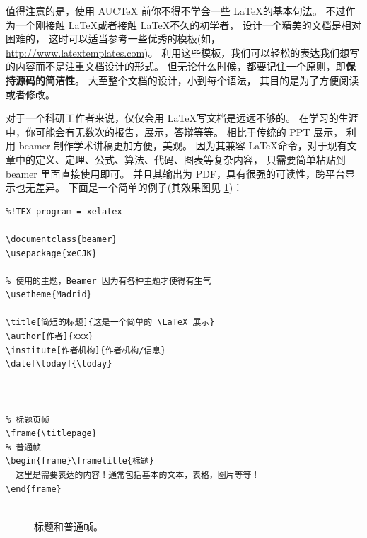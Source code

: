 值得注意的是，使用 AUCTeX 前你不得不学会一些 \LaTeX 的基本句法。
不过作为一个刚接触 \LaTeX 或者接触 \LaTeX 不久的初学者，
设计一个精美的文档是相对困难的，
这时可以适当参考一些优秀的模板(如，\url{http://www.latextemplates.com})。
利用这些模板，我们可以轻松的表达我们想写的内容而不是注重文档设计的形式。
但无论什么时候，都要记住一个原则，即\textbf{保持源码的简洁性}。
大至整个文档的设计，小到每个语法，
其目的是为了方便阅读或者修改。

对于一个科研工作者来说，仅仅会用 \LaTeX 写文档是远远不够的。
在学习的生涯中，你可能会有无数次的报告，展示，答辩等等。
相比于传统的 PPT 展示，
利用 beamer 制作学术讲稿更加方便，美观。
因为其兼容 \LaTeX 命令，对于现有文章中的定义、定理、公式、算法、代码、图表等复杂内容，
只需要简单粘贴到 beamer 里面直接使用即可。
并且其输出为 PDF，具有很强的可读性，跨平台显示也无差异。
下面是一个简单的例子(其效果图见 \ref{fig:beamer})：
\begin{verbatim}
%!TEX program = xelatex

\documentclass{beamer}
\usepackage{xeCJK}

% 使用的主题，Beamer 因为有各种主题才使得有生气
\usetheme{Madrid}

\title[简短的标题]{这是一个简单的 \LaTeX 展示}
\author[作者]{xxx}
\institute[作者机构]{作者机构/信息}
\date[\today]{\today}



% 标题页帧
\frame{\titlepage}
% 普通帧
\begin{frame}\frametitle{标题}
  这里是需要表达的内容！通常包括基本的文本，表格，图片等等！
\end{frame}


\end{verbatim}

\begin{figure}[htbp]
	\centering
	\hfill
        \caption{标题和普通帧。}
	\label{fig:beamer}
\end{figure}

